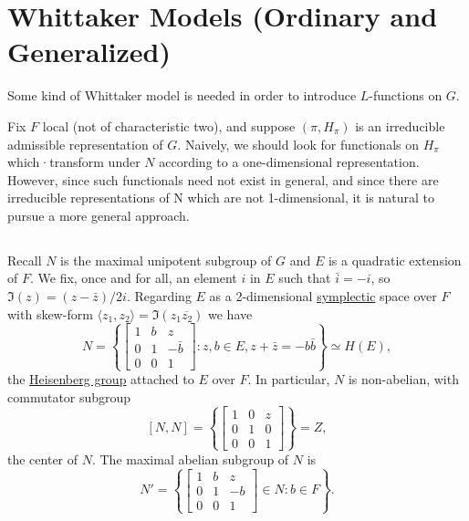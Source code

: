 \section{Whittaker Models (Ordinary and Generalized)}
\label{sec:1}


Some kind of Whittaker model is needed in order to introduce $L$-functions on $G$.

Fix $F$ local (not of characteristic two), and suppose $(\pi, H_\pi)$ is an irreducible admissible representation of $G$.
Naively, we should look for functionals on $H_\pi$ which·transform under $N$ according to a one-dimensional
representation.
However, since such functionals need not exist in general, and since there are irreducible representations of N which are not 1-dimensional, it is natural to pursue a more general approach.


\subsection{}

Recall $N$ is the maximal unipotent subgroup of $G$ and $E$ is a quadratic extension of $F$.
We fix, once and for all, an element $i$ in $E$ such that $\bar{i} = -i$, so $\Im(z) = (z - \bar{z}) / 2i$.
Regarding $E$ as a 2-dimensional \underline{symplectic} space over $F$ with skew-form $\langle z_1, z_2\rangle = \Im(z_1\overline{z_2})$ we have
\[
    N = \left\{\begin{bmatrix}1 & b& z \\ 0 & 1 & -\bar{b} \\ 0 & 0 & 1\end{bmatrix}: z, b \in E, z + \bar{z} = -b\bar{b}\right\} \simeq H(E),
\]
the \underline{Heisenberg group} attached to $E$ over $F$.
In particular, $N$ is non-abelian, with commutator subgroup
\[
    [N, N] =\left\{\begin{bmatrix} 1 & 0 & z \\ 0 & 1 & 0 \\ 0 & 0 & 1\end{bmatrix}\right\} = Z,
\]
the center of $N$.
The maximal abelian subgroup of $N$ is
\[
    N' = \left\{\begin{bmatrix} 1 & b& z \\ 0 & 1 & -b \\ 0 & 0 & 1\end{bmatrix} \in N: b \in F\right\}.
\]


